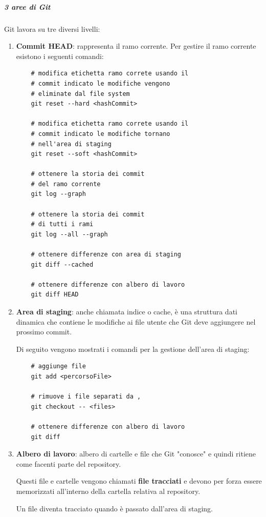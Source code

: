 \subparagraph{3 aree di Git}
\label{subpar:3_aree_git}
Git lavora su tre diversi livelli:
\begin{enumerate}
    \item \textbf{Commit HEAD}: rappresenta il ramo corrente.
    Per gestire il ramo corrente esistono i seguenti comandi:
    \begin{lstlisting}
    # modifica etichetta ramo correte usando il
    # commit indicato le modifiche vengono 
    # eliminate dal file system
    git reset --hard <hashCommit>

    # modifica etichetta ramo correte usando il
    # commit indicato le modifiche tornano 
    # nell'area di staging 
    git reset --soft <hashCommit>

    # ottenere la storia dei commit 
    # del ramo corrente
    git log --graph
    
    # ottenere la storia dei commit 
    # di tutti i rami
    git log --all --graph

    # ottenere differenze con area di staging
    git diff --cached
    
    # ottenere differenze con albero di lavoro
    git diff HEAD
    \end{lstlisting}
    
    \item \textbf{Area di staging}: anche chiamata indice o cache, è una struttura dati dinamica che contiene le modifiche ai file utente che Git deve aggiungere nel prossimo commit.
    
    Di seguito vengono mostrati i comandi per la gestione dell'area di staging:
    \begin{lstlisting}
    # aggiunge file
    git add <percorsoFile>

    # rimuove i file separati da ,
    git checkout -- <files>

    # ottenere differenze con albero di lavoro
    git diff 
    \end{lstlisting}
    
    \item \textbf{Albero di lavoro}: albero di cartelle e file che Git "conosce" e quindi ritiene come facenti parte del repository.
    
    Questi file e cartelle vengono chiamati \textbf{file tracciati} e devono per forza essere memorizzati all'interno della cartella relativa al repository.

    Un file diventa tracciato quando è passato dall'area di staging.
\end{enumerate}


